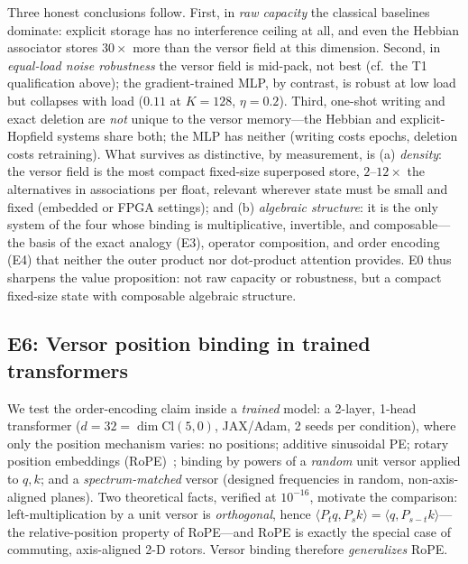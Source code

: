 \documentclass[10pt,twocolumn]{article}
\newcommand{\Cl}{\mathrm{Cl}}
\begin{document}
Three honest conclusions follow. First, in \emph{raw capacity} the classical
baselines dominate: explicit storage has no interference ceiling at all, and even
the Hebbian associator stores $30\times$ more than the versor field at this
dimension. Second, in \emph{equal-load noise robustness} the versor field is
mid-pack, not best (cf.\ the T1 qualification above); the gradient-trained MLP,
by contrast, is robust at low load but collapses with load ($0.11$ at $K{=}128$,
$\eta{=}0.2$). Third, one-shot writing and exact deletion are \emph{not} unique
to the versor memory---the Hebbian and explicit-Hopfield systems share both; the
MLP has neither (writing costs epochs, deletion costs retraining). What survives
as distinctive, by measurement, is (a) \emph{density}: the versor field is the
most compact fixed-size superposed store, $2$--$12\times$ the alternatives in
associations per float, relevant wherever state must be small and fixed (embedded
or FPGA settings); and (b) \emph{algebraic structure}: it is the only system of
the four whose binding is multiplicative, invertible, and composable---the basis
of the exact analogy (E3), operator composition, and order encoding (E4) that
neither the outer product nor dot-product attention provides. E0 thus sharpens
the value proposition: not raw capacity or robustness, but a compact fixed-size
state with composable algebraic structure.

\subsection{E6: Versor position binding in trained transformers}
\label{sec:e6}
We test the order-encoding claim inside a \emph{trained} model: a 2-layer,
1-head transformer ($d{=}32{=}\dim\Cl(5,0)$, JAX/Adam, 2 seeds per condition),
where only the position mechanism varies: no positions; additive sinusoidal PE;
rotary position embeddings (RoPE)~\cite{su2021roformer}; binding by powers of a
\emph{random} unit versor applied to $q,k$; and a \emph{spectrum-matched} versor
(designed frequencies in random, non-axis-aligned planes). Two theoretical facts,
verified at $10^{-16}$, motivate the comparison: left-multiplication by a unit
versor is \emph{orthogonal}, hence
$\langle P_t q, P_s k\rangle=\langle q, P_{s-t}k\rangle$---the relative-position
property of RoPE---and RoPE is exactly the special case of commuting,
axis-aligned 2-D rotors. Versor binding therefore \emph{generalizes} RoPE.
\end{document}
